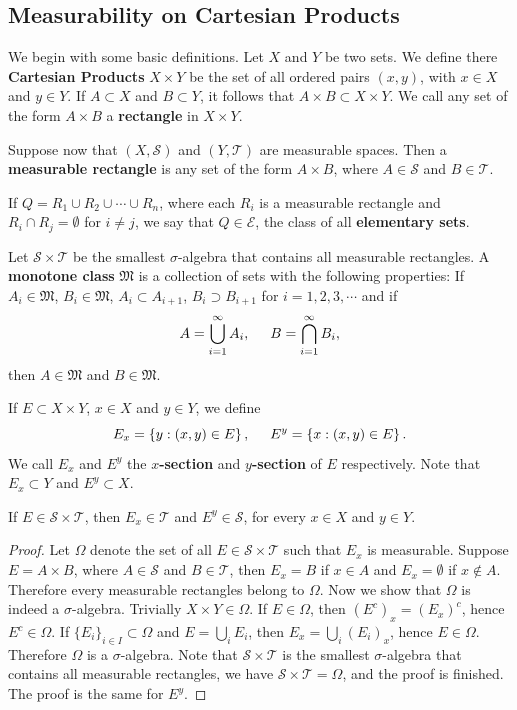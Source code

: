 \subsection{Measurability on Cartesian Products}
We begin with some basic definitions. Let $X$ and $Y$ be two sets. We define there \textbf{Cartesian Products} $X\times Y$ be the set of all ordered pairs $(x,y)$, with $x\in X$ and $y\in Y$. If $A\subset X$ and $B\subset Y$, it follows that $A\times B\subset X\times Y$. We call any set of the form $A\times B$ a \textbf{rectangle} in $X\times Y$.\par
Suppose now that $(X,\mathscr{S})$ and $(Y,\mathscr{T})$ are measurable spaces. Then a \textbf{measurable rectangle} is any set of the form $A\times B$, where $A\in\mathscr{S}$ and $B\in\mathscr{T}$.\par
If $Q=R_1\cup R_2\cup\cdots\cup R_n$, where each $R_i$ is a measurable rectangle and $R_i\cap R_j=\emptyset$ for $i\ne j$, we say that $Q\in\mathscr{E}$, the class of all \textbf{elementary sets}.\par
Let $\mathscr{S}\times\mathscr{T}$ be the smallest $\sigma$-algebra that contains all measurable rectangles. A \textbf{monotone class} $\mathfrak{M}$ is a collection of sets with the following properties: If $A_i\in\mathfrak{M}$, $B_i\in\mathfrak{M}$, $A_i\subset A_{i+1}$, $B_i\supset B_{i+1}$ for $i=1,2,3,\cdots$ and if
$$
A=\bigcup_{i=1}^{\infty}{A_i},\hspace{0.5cm}B=\bigcap_{i=1}^{\infty}{B_i},
$$
then $A\in\mathfrak{M}$ and $B\in\mathfrak{M}$.\par
If $E\subset X\times Y$, $x\in X$ and $y\in Y$, we define 
$$
E_x=\left\{ y:\left( x,y \right) \in E \right\} ,\hspace{0.5cm}E^y=\left\{ x:\left( x,y \right) \in E \right\} .
$$
We call $E_x$ and $E^y$ the \textbf{$x$-section} and \textbf{$y$-section} of $E$ respectively. Note that $E_x\subset Y$ and $E^y\subset X$.
\begin{theorem}
If $E\in\mathscr{S}\times\mathscr{T}$, then $E_x\in\mathscr{T}$ and $E^y\in\mathscr{S}$, for every $x\in X$ and $y\in Y$.
\end{theorem}
\begin{proof}
Let $\Omega$ denote the set of all $E\in\mathscr{S}\times\mathscr{T}$ such that $E_x$ is measurable. Suppose $E=A\times B$, where $A\in\mathscr{S}$ and $B\in\mathscr{T}$, then $E_x=B$ if $x\in A$ and $E_x=\emptyset$ if $x\notin A$. Therefore every measurable rectangles belong to $\Omega$. Now we show that $\Omega$ is indeed a $\sigma$-algebra. Trivially $X\times Y\in\Omega$. If $E\in\Omega$, then $(E^c)_x=(E_x)^c$, hence $E^c\in\Omega$. If $\{E_i\}_{i\in I}\subset\Omega$ and $E=\bigcup_iE_i$, then $E_x=\bigcup_i(E_i)_x$, hence $E\in\Omega$. Therefore $\Omega$ is a $\sigma$-algebra. Note that $\mathscr{S}\times\mathscr{T}$ is the smallest $\sigma$-algebra that contains all measurable rectangles, we have $\mathscr{S}\times\mathscr{T}=\Omega$, and the proof is finished. The proof is the same for $E^y$.
\end{proof}
